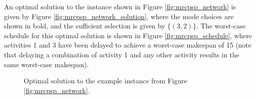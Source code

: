 \documentclass[a4paper,abstracton]{scrartcl}
\begin{document}
An optimal solution to the instance shown in Figure \ref{fig:mrcpsp_network} is given by Figure \ref{fig:mrcpsp_network_solution}, where the mode choices are shown in bold, and the sufficient selection is given by $\{(3,2)\}$. The worst-case schedule for this optimal solution is shown in Figure \ref{fig:mrcpsp_schedule}, where activities 1 and 3 have been delayed to achieve a worst-case makespan of 15 (note that delaying a combination of activity 1 and any other activity results in the same worst-case makespan).

\begin{figure}[htb]
	\caption{Optimal solution to the example instance from Figure \ref{fig:mrcpsp_network}.}
	\label{fig:mrcpsp_solution}
\end{figure}
\end{document}
